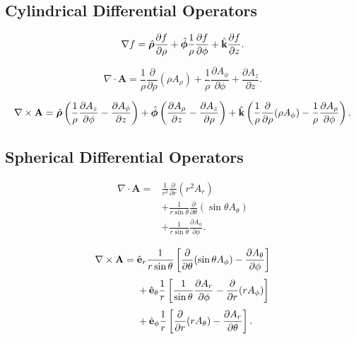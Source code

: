 \documentclass{otscience}
\begin{document}
\subsection{Cylindrical Differential Operators}

\begin{formulabox}
    \[
        \nabla f=\hat{\boldsymbol{\rho}}\frac{\partial f}{\partial\rho}+\hat{\boldsymbol{\phi}}\frac{1}{\rho}\frac{\partial f}{\partial\phi}+\hat{\mathbf{k}}\frac{\partial f}{\partial z}.
    \]

    \[
        \nabla\cdot\mathbf{A}=\frac{1}{\rho}\frac{\partial}{\partial\rho}(\rho A_\rho)+\frac{1}{\rho}\frac{\partial A_\phi}{\partial\phi}+\frac{\partial A_z}{\partial z}.
    \]

    \[
        \nabla\times\mathbf{A}=
        \hat{\boldsymbol{\rho}}\left(\frac{1}{\rho}\frac{\partial A_z}{\partial\phi}-\frac{\partial A_\phi}{\partial z}\right)
        +\hat{\boldsymbol{\phi}}\left(\frac{\partial A_\rho}{\partial z}-\frac{\partial A_z}{\partial\rho}\right)
        +\hat{\mathbf{k}}\left(\frac{1}{\rho}\frac{\partial}{\partial\rho}(\rho A_\phi)-\frac{1}{\rho}\frac{\partial A_\rho}{\partial\phi}\right).
    \]
\end{formulabox}

\subsection{Spherical Differential Operators}

\begin{formulabox}
\[
\begin{aligned}
    \nabla\cdot\mathbf{A}
    ={}&
    \frac{1}{r^2}
    \frac{\partial}{\partial r}(r^2A_r)
    \\[2pt]
    &+
    \frac{1}{r\sin\theta}
    \frac{\partial}{\partial\theta}
    (\sin\theta A_\theta)
    \\[2pt]
    &+
    \frac{1}{r\sin\theta}
    \frac{\partial A_\phi}{\partial\phi}.
\end{aligned}
\]

\[
\begin{aligned}
    \nabla\times\mathbf{A}
    ={}&
    \hat{\mathbf{e}}_r\frac{1}{r\sin\theta}
    \left[
        \frac{\partial}{\partial\theta}(\sin\theta A_\phi)
        -
        \frac{\partial A_\theta}{\partial\phi}
    \right]
    \\[3pt]
    &+
    \hat{\mathbf{e}}_\theta\frac{1}{r}
    \left[
        \frac{1}{\sin\theta}
        \frac{\partial A_r}{\partial\phi}
        -
        \frac{\partial}{\partial r}(rA_\phi)
    \right]
    \\[3pt]
    &+
    \hat{\mathbf{e}}_\phi\frac{1}{r}
    \left[
        \frac{\partial}{\partial r}(rA_\theta)
        -
        \frac{\partial A_r}{\partial\theta}
    \right].
\end{aligned}
\]
\end{formulabox}
\end{document}
